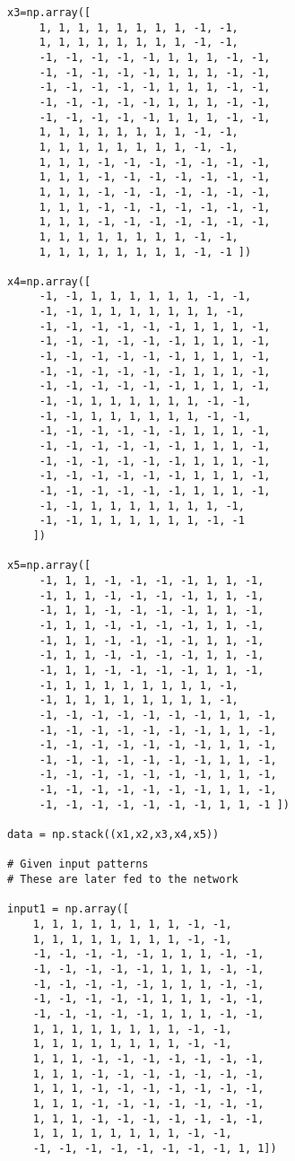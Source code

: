\documentclass{article}
\begin{document}
\begin{verbatim}
x3=np.array([
     1, 1, 1, 1, 1, 1, 1, 1, -1, -1,
     1, 1, 1, 1, 1, 1, 1, 1, -1, -1,
     -1, -1, -1, -1, -1, 1, 1, 1, -1, -1,
     -1, -1, -1, -1, -1, 1, 1, 1, -1, -1,
     -1, -1, -1, -1, -1, 1, 1, 1, -1, -1,
     -1, -1, -1, -1, -1, 1, 1, 1, -1, -1,
     -1, -1, -1, -1, -1, 1, 1, 1, -1, -1,
     1, 1, 1, 1, 1, 1, 1, 1, -1, -1,
     1, 1, 1, 1, 1, 1, 1, 1, -1, -1,
     1, 1, 1, -1, -1, -1, -1, -1, -1, -1,
     1, 1, 1, -1, -1, -1, -1, -1, -1, -1,
     1, 1, 1, -1, -1, -1, -1, -1, -1, -1,
     1, 1, 1, -1, -1, -1, -1, -1, -1, -1,
     1, 1, 1, -1, -1, -1, -1, -1, -1, -1,
     1, 1, 1, 1, 1, 1, 1, 1, -1, -1,
     1, 1, 1, 1, 1, 1, 1, 1, -1, -1 ])

x4=np.array([
     -1, -1, 1, 1, 1, 1, 1, 1, -1, -1,
     -1, -1, 1, 1, 1, 1, 1, 1, 1, -1,
     -1, -1, -1, -1, -1, -1, 1, 1, 1, -1,
     -1, -1, -1, -1, -1, -1, 1, 1, 1, -1,
     -1, -1, -1, -1, -1, -1, 1, 1, 1, -1,
     -1, -1, -1, -1, -1, -1, 1, 1, 1, -1,
     -1, -1, -1, -1, -1, -1, 1, 1, 1, -1,
     -1, -1, 1, 1, 1, 1, 1, 1, -1, -1,
     -1, -1, 1, 1, 1, 1, 1, 1, -1, -1,
     -1, -1, -1, -1, -1, -1, 1, 1, 1, -1,
     -1, -1, -1, -1, -1, -1, 1, 1, 1, -1,
     -1, -1, -1, -1, -1, -1, 1, 1, 1, -1,
     -1, -1, -1, -1, -1, -1, 1, 1, 1, -1,
     -1, -1, -1, -1, -1, -1, 1, 1, 1, -1,
     -1, -1, 1, 1, 1, 1, 1, 1, 1, -1,
     -1, -1, 1, 1, 1, 1, 1, 1, -1, -1
    ])

x5=np.array([
     -1, 1, 1, -1, -1, -1, -1, 1, 1, -1,
     -1, 1, 1, -1, -1, -1, -1, 1, 1, -1,
     -1, 1, 1, -1, -1, -1, -1, 1, 1, -1,
     -1, 1, 1, -1, -1, -1, -1, 1, 1, -1,
     -1, 1, 1, -1, -1, -1, -1, 1, 1, -1,
     -1, 1, 1, -1, -1, -1, -1, 1, 1, -1,
     -1, 1, 1, -1, -1, -1, -1, 1, 1, -1,
     -1, 1, 1, 1, 1, 1, 1, 1, 1, -1,
     -1, 1, 1, 1, 1, 1, 1, 1, 1, -1,
     -1, -1, -1, -1, -1, -1, -1, 1, 1, -1,
     -1, -1, -1, -1, -1, -1, -1, 1, 1, -1,
     -1, -1, -1, -1, -1, -1, -1, 1, 1, -1,
     -1, -1, -1, -1, -1, -1, -1, 1, 1, -1,
     -1, -1, -1, -1, -1, -1, -1, 1, 1, -1,
     -1, -1, -1, -1, -1, -1, -1, 1, 1, -1,
     -1, -1, -1, -1, -1, -1, -1, 1, 1, -1 ])

data = np.stack((x1,x2,x3,x4,x5))

# Given input patterns
# These are later fed to the network

input1 = np.array([
    1, 1, 1, 1, 1, 1, 1, 1, -1, -1, 
    1, 1, 1, 1, 1, 1, 1, 1, -1, -1, 
    -1, -1, -1, -1, -1, 1, 1, 1, -1, -1, 
    -1, -1, -1, -1, -1, 1, 1, 1, -1, -1, 
    -1, -1, -1, -1, -1, 1, 1, 1, -1, -1, 
    -1, -1, -1, -1, -1, 1, 1, 1, -1, -1, 
    -1, -1, -1, -1, -1, 1, 1, 1, -1, -1, 
    1, 1, 1, 1, 1, 1, 1, 1, -1, -1, 
    1, 1, 1, 1, 1, 1, 1, 1, -1, -1, 
    1, 1, 1, -1, -1, -1, -1, -1, -1, -1, 
    1, 1, 1, -1, -1, -1, -1, -1, -1, -1, 
    1, 1, 1, -1, -1, -1, -1, -1, -1, -1, 
    1, 1, 1, -1, -1, -1, -1, -1, -1, -1, 
    1, 1, 1, -1, -1, -1, -1, -1, -1, -1, 
    1, 1, 1, 1, 1, 1, 1, 1, -1, -1, 
    -1, -1, -1, -1, -1, -1, -1, -1, 1, 1]) 


\end{verbatim}
\end{document}
